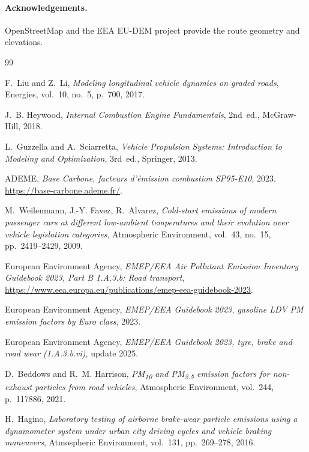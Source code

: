 \documentclass[11pt,a4paper]{article}
\begin{document}
\paragraph{Acknowledgements.} OpenStreetMap and the EEA EU-DEM project
provide the route geometry and elevations.


\begin{thebibliography}{99}

F.~Liu and Z.~Li, \emph{Modeling longitudinal vehicle dynamics on
graded roads}, Energies, vol.~10, no.~5, p.~700, 2017.

J.~B. Heywood, \emph{Internal Combustion Engine Fundamentals},
2nd~ed., McGraw-Hill, 2018.

L.~Guzzella and A.~Sciarretta, \emph{Vehicle Propulsion Systems:
Introduction to Modeling and Optimization}, 3rd~ed., Springer, 2013.

ADEME, \emph{Base Carbone, facteurs d'\'emission combustion SP95-E10},
2023, \url{https://base-carbone.ademe.fr/}.

M.~Weilenmann, J.-Y. Favez, R.~Alvarez,
\emph{Cold-start emissions of modern passenger cars at different
low-ambient temperatures and their evolution over vehicle legislation
categories}, Atmospheric Environment, vol.~43, no.~15, pp.~2419--2429,
2009.

European Environment Agency, \emph{EMEP/EEA Air Pollutant Emission
Inventory Guidebook 2023, Part B 1.A.3.b: Road transport},
\url{https://www.eea.europa.eu/publications/emep-eea-guidebook-2023}.

European Environment Agency, \emph{EMEP/EEA Guidebook 2023, gasoline
LDV PM emission factors by Euro class}, 2023.

European Environment Agency, \emph{EMEP/EEA Guidebook 2023, tyre,
brake and road wear (1.A.3.b.vi)}, update 2025.

D.~Beddows and R.~M. Harrison, \emph{PM\textsubscript{10} and
PM\textsubscript{2.5} emission factors for non-exhaust particles
from road vehicles}, Atmospheric Environment, vol.~244, p.~117886,
2021.

H.~Hagino, \emph{Laboratory testing of airborne brake-wear particle
emissions using a dynamometer system under urban city driving cycles
and vehicle braking maneuvers}, Atmospheric Environment, vol.~131,
pp.~269--278, 2016.

\end{thebibliography}
\end{document}
